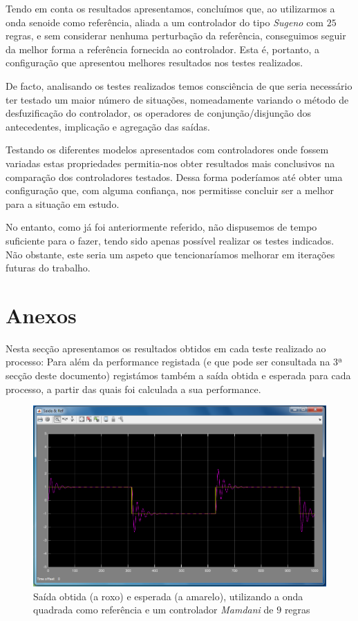 \documentclass{article}
\begin{document}
Tendo em conta os resultados apresentamos, concluímos que, ao utilizarmos a onda senoide como referência, aliada a um controlador do tipo \emph{Sugeno} com $25$ regras, e sem considerar nenhuma perturbação da referência, conseguimos seguir da melhor forma a referência fornecida ao controlador. Esta é, portanto, a configuração que apresentou melhores resultados nos testes realizados.

De facto, analisando os testes realizados temos consciência de que seria necessário ter testado um maior número de situações, nomeadamente variando o método de desfuzificação do controlador, os operadores de conjunção/disjunção dos antecedentes, implicação e agregação das saídas.

Testando os diferentes modelos apresentados com controladores onde fossem variadas estas propriedades permitia-nos obter resultados mais conclusivos na comparação dos controladores testados. Dessa forma poderíamos até obter uma configuração que, com alguma confiança, nos permitisse concluir ser a melhor para a situação em estudo.

No entanto, como já foi anteriormente referido, não dispusemos de tempo suficiente para o fazer, tendo sido apenas possível realizar os testes indicados. Não obstante, este seria um aspeto que tencionaríamos melhorar em iterações futuras do trabalho.

\pagebreak

\section{Anexos}

Nesta secção apresentamos os resultados obtidos em cada teste realizado ao processo: Para além da performance registada (e que pode ser consultada na 3ª secção deste documento) registámos também a saída obtida e esperada para cada processo, a partir das quais foi calculada a sua performance.

\vspace{.2cm}


\begin{figure}[h]
  \centering
      \includegraphics[scale=0.3]{Images/Mamdani_9_square.png}
  \caption{Saída obtida (a roxo) e esperada (a amarelo), utilizando a onda quadrada como referência e um controlador \emph{Mamdani} de $9$ regras}
\end{figure}
\end{document}

